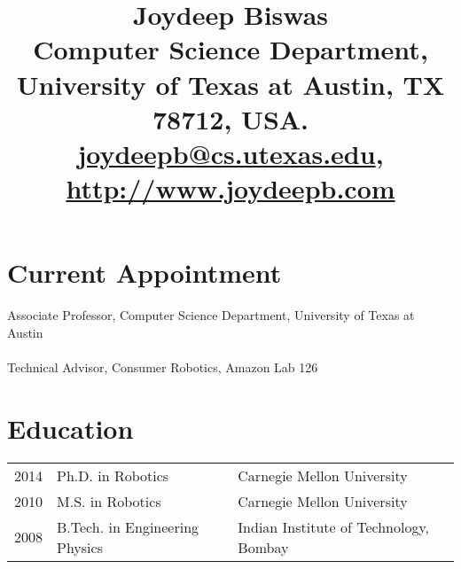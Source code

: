 \documentclass[Times]{article}
\begin{document}
\title{
\vspace{-3em}
\textbf{Joydeep Biswas}\\
\vspace{0.5em}
\normalsize{
Computer Science Department, University of Texas at Austin, TX 78712, USA.\\
\href{mailto:joydeepb@cs.utexas.edu}{joydeepb@cs.utexas.edu}, \href{http://www.joydeepb.com}{http://www.joydeepb.com}\vspace{-3em}}
}
\date{}
\maketitle


\section*{Current Appointment}

Associate Professor, Computer Science Department,
University of Texas at Austin\\
\vspace{-0.5em}\\
Technical Advisor, Consumer Robotics, Amazon Lab 126

\section*{Education}
\begin{tabular}{ p{1.2cm} l l }
  2014  & Ph.D. in Robotics  & Carnegie Mellon University \\
  2010  & M.S. in Robotics  & Carnegie Mellon University \\
  2008  & B.Tech. in Engineering Physics & Indian Institute of Technology, Bombay \\
\end{tabular}
\end{document}

